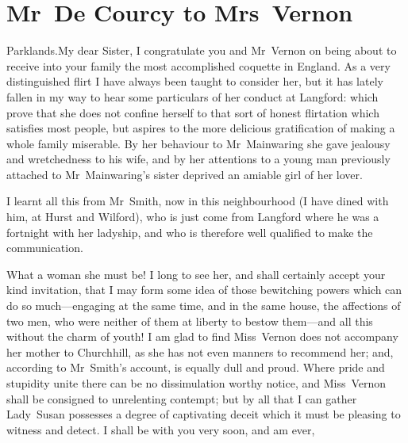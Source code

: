 \chapter{Mr~De Courcy to Mrs~Vernon}
	
	\begin{mail}{Parklands.}{My dear Sister,}
I congratulate you and Mr~Vernon on being about to receive into your family the most accomplished coquette in England. As a very distinguished flirt I have always been taught to consider her, but it has lately fallen in my way to hear some particulars of her conduct at Langford: which prove that she does not confine herself to that sort of honest flirtation which satisfies most people, but aspires to the more delicious gratification of making a whole family miserable. By her behaviour to Mr~Mainwaring she gave jealousy and wretchedness to his wife, and by her attentions to a young man previously attached to Mr~Mainwaring's sister deprived an amiable girl of her lover.

I learnt all this from Mr~Smith, now in this neighbourhood (I have dined with him, at Hurst and Wilford), who is just come from Langford where he was a fortnight with her ladyship, and who is therefore well qualified to make the communication.

What a woman she must be! I long to see her, and shall certainly accept your kind invitation, that I may form some idea of those bewitching powers which can do so much—engaging at the same time, and in the same house, the affections of two men, who were neither of them at liberty to bestow them—and all this without the charm of youth! I am glad to find Miss~Vernon does not accompany her mother to Churchhill, as she has not even manners to recommend her; and, according to Mr~Smith's account, is equally dull and proud. Where pride and stupidity unite there can be no dissimulation worthy notice, and Miss~Vernon shall be consigned to unrelenting contempt; but by all that I can gather Lady~Susan possesses a degree of captivating deceit which it must be pleasing to witness and detect. I shall be with you very soon, and am ever, 
\end{mail}